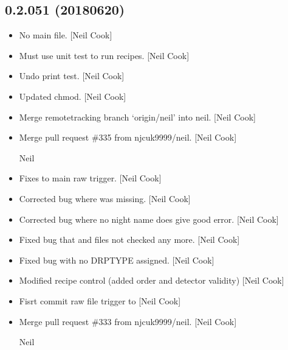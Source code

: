 \documentclass[a4paper,10pt,english]{report}
\begin{document}
\subsection{0.2.051 (2018\sphinxhyphen{}06\sphinxhyphen{}20)}
\label{\detokenize{misc/changelog:id434}}\begin{itemize}
\item {} 
No main file. {[}Neil Cook{]}

\item {} 
Must use unit test to run recipes. {[}Neil Cook{]}

\item {} 
Undo print test. {[}Neil Cook{]}

\item {} 
Updated chmod. {[}Neil Cook{]}

\item {} 
Merge remote\sphinxhyphen{}tracking branch ‘origin/neil’ into neil. {[}Neil Cook{]}

\item {} 
Merge pull request \#335 from njcuk9999/neil. {[}Neil Cook{]}

Neil

\item {} 
Fixes to main raw trigger. {[}Neil Cook{]}

\item {} 
Corrected bug where  was missing. {[}Neil Cook{]}

\item {} 
Corrected bug where no night name does give good error. {[}Neil Cook{]}

\item {} 
Fixed bug that  and files not checked any more. {[}Neil
Cook{]}

\item {} 
Fixed bug with no DRPTYPE assigned. {[}Neil Cook{]}

\item {} 
Modified recipe control (added order and detector validity) {[}Neil
Cook{]}

\item {} 
Fisrt commit \sphinxhyphen{} raw file trigger  to  {[}Neil Cook{]}

\item {} 
Merge pull request \#333 from njcuk9999/neil. {[}Neil Cook{]}

Neil

\end{itemize}
\end{document}
